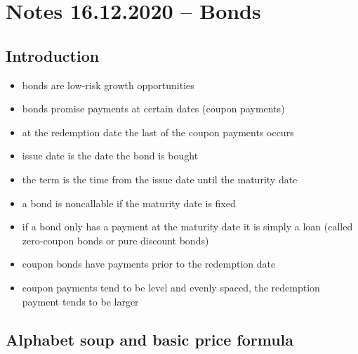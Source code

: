 \documentclass[../00_main.tex]{subfiles}
\begin{document}
\section{Notes 16.12.2020 -- Bonds}

\subsection{Introduction}

\begin{itemize}
    \item bonds are low-risk growth opportunities
    \item bonds promise payments at certain dates (coupon payments)
    \item at the redemption date the last of the coupon payments occurs
    \item issue date is the date the bond is bought
    \item the term is the time from the issue date until the maturity date
    \item a bond is noncallable if the maturity date is fixed
    \item if a bond only has a payment at the maturity date it is simply a loan
        (called zero-coupon bonds or pure discount bonds)
    \item coupon bonds have payments prior to the redemption date
    \item coupon payments tend to be level and evenly spaced, the redemption
        payment tends to be larger
\end{itemize}

\subsection{Alphabet soup and basic price formula}
\end{document}
